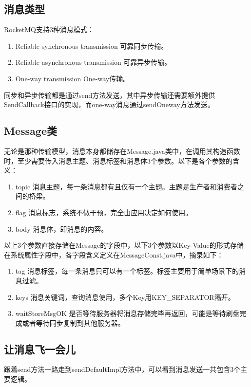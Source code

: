 \subsection{消息类型}
RocketMQ支持3种消息模式：

\begin{enumerate}[itemindent=1em]
\item Reliable synchronous transmission 可靠同步传输。
\item Reliable asynchronous transmission 可靠异步传输。
\item One-way transmission One-way传输。
\end{enumerate} 

同步和异步传输都是通过send方法发送，其中异步传输还需要额外提供SendCallback接口的实现，而one-way消息通过sendOneway方法发送。

\subsection{Message类}
无论是那种传输模型，消息本身都储存在Message.java类中，在调用其构造函数时，至少需要传入消息主题、消息标签和消息体3个参数。以下是各个参数的含义：

\begin{enumerate}[itemindent=1em]
\item topic 消息主题，每一条消息都有且仅有一个主题。主题是生产者和消费者之间的桥梁。
\item flag 消息标志，系统不做干预，完全由应用决定如何使用。
\item body 消息体，即消息的内容。
\end{enumerate} 


以上3个参数直接存储在Message的字段中，以下3个参数以Key-Value的形式存储在系统属性字段中，各字段含义定义在MessageConst.java中，摘录如下：
\begin{enumerate}[itemindent=1em]
\item tag 消息标签，每一条消息只可以有一个标签。标签主要用于简单场景下的消息过滤\cite{filter-example}。
\item keys 消息关键词，查询消息使用，多个Key用KEY\_SEPARATOR隔开。
\item waitStoreMsgOK 是否等待服务器将消息存储完毕再返回，可能是等待刷盘完成或者等待同步复制到其他服务器。
\end{enumerate} 


\subsection{让消息飞一会儿}
跟着send方法一路走到sendDefaultImpl方法中，可以看到消息发送一共包含3个主要逻辑。

